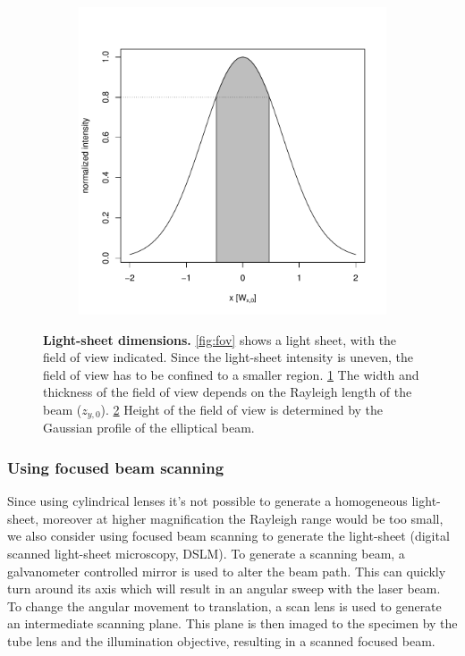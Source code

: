 \documentclass{tdk_style}
\begin{document}
\begin{figure}[htbp]
\begin{subfigure}[b]{0.49\textwidth}
		\caption{}
		\label{fig:width}
	\end{subfigure}
	\begin{subfigure}[b]{0.49\textwidth}
		\centering
		\includegraphics[width=\textwidth]{figures/2_spim/height}
		\caption{}
		\label{fig:height}
	\end{subfigure}
	\caption{\textbf{Light-sheet dimensions.} \ref{fig:fov} shows a light sheet, with the field of view indicated. Since the light-sheet intensity is uneven, the field of view has to be confined to a smaller region. \ref{fig:width} The width and thickness of the field of view depends on the Rayleigh length of the beam ($z_{y,0}$). \ref{fig:height} Height of the field of view is determined by the Gaussian profile of the elliptical beam.}
	\label{fig:ls_dim}
\end{figure}

\subsubsection{Using focused beam scanning}
Since using cylindrical lenses it's not possible to generate a homogeneous light-sheet, moreover at higher magnification the Rayleigh range would be too small, we also consider using focused beam scanning to generate the light-sheet (digital scanned light-sheet microscopy, DSLM). To generate a scanning beam, a galvanometer controlled mirror is used to alter the beam path. This can quickly turn around its axis which will result in an angular sweep with the laser beam. To change the angular movement to translation, a scan lens is used to generate an intermediate scanning plane. This plane is then imaged to the specimen by the tube lens and the illumination objective, resulting in a scanned focused beam.
\end{document}

